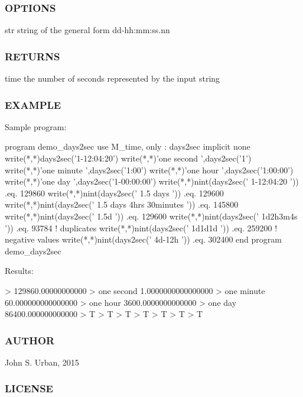 \subsubsection*{O\+P\+T\+I\+O\+NS}

str string of the general form dd-\/hh\+:mm\+:ss.\+nn \subsubsection*{R\+E\+T\+U\+R\+NS}

time the number of seconds represented by the input string

\subsubsection*{E\+X\+A\+M\+P\+LE}

\begin{DoxyVerb}Sample program:

 program demo_days2sec
 use M_time, only : days2sec
 implicit none
    write(*,*)days2sec('1-12:04:20')
    write(*,*)'one second ',days2sec('1')
    write(*,*)'one minute ',days2sec('1:00')
    write(*,*)'one hour ',days2sec('1:00:00')
    write(*,*)'one day ',days2sec('1-00:00:00')
    write(*,*)nint(days2sec(' 1-12:04:20              ')) .eq. 129860
    write(*,*)nint(days2sec(' 1.5 days                ')) .eq. 129600
    write(*,*)nint(days2sec(' 1.5 days 4hrs 30minutes ')) .eq. 145800
    write(*,*)nint(days2sec(' 1.5d                    ')) .eq. 129600
    write(*,*)nint(days2sec(' 1d2h3m4s                ')) .eq. 93784
    ! duplicates
    write(*,*)nint(days2sec(' 1d1d1d                  ')) .eq. 259200
    ! negative values
    write(*,*)nint(days2sec(' 4d-12h                  ')) .eq. 302400
 end program demo_days2sec

Results:

 > 129860.00000000000
 > one second    1.0000000000000000
 > one minute    60.000000000000000
 > one hour    3600.0000000000000
 > one day    86400.000000000000
 > T
 > T
 > T
 > T
 > T
 > T
 > T
\end{DoxyVerb}


\subsubsection*{A\+U\+T\+H\+OR}

John S. Urban, 2015 \subsubsection*{L\+I\+C\+E\+N\+SE}


